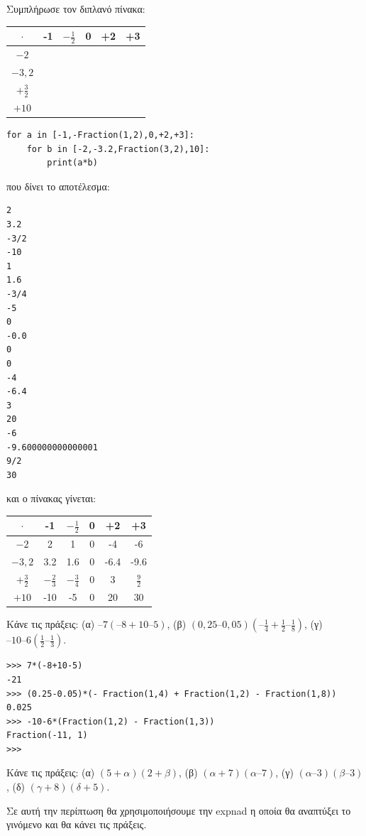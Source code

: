 \begin{exercise}
Συμπλήρωσε τον διπλανό πίνακα:
\begin{table}[h]
\begin{tabular}{|c|c|c|c|c|c|}
\hline
$\cdot$&-1&$-\frac{1}{2}$&0&+2&+3\\\hline
$-2$&&&&&\\\hline
$-3,2$&&&&&\\\hline
$+\frac{3}{2}$&&&&&\\\hline
$+10$&&&&&\\\hline
\end{tabular}
\end{table}
\end{exercise}
\begin{lstlisting}
for a in [-1,-Fraction(1,2),0,+2,+3]:
    for b in [-2,-3.2,Fraction(3,2),10]:
        print(a*b)
\end{lstlisting}
που δίνει το αποτέλεσμα:
\begin{lstlisting}
2
3.2
-3/2
-10
1
1.6
-3/4
-5
0
-0.0
0
0
-4
-6.4
3
20
-6
-9.600000000000001
9/2
30
\end{lstlisting}
και ο πίνακας γίνεται:
\begin{table}[h]
\begin{tabular}{|c|c|c|c|c|c|}
\hline
$\cdot$&-1&$-\frac{1}{2}$&0&+2&+3\\\hline
$-2$&2&1&0&-4&-6\\\hline
$-3,2$&3.2&1.6&0&-6.4&-9.6\\\hline
$+\frac{3}{2}$&$-\frac{2}{3}$&$-\frac{3}{4}$&0&3&$\frac{9}{2}$\\\hline
$+10$&-10&-5&0&20&30\\\hline
\end{tabular}
\end{table}
\begin{exercise}
Κάνε  τις πράξεις:  (α) $–7(–8+10–5)$,  (β) $(0,25–0,05)(– \frac{1}{4} + \frac{1}{2} – \frac{1}{8} )$,    (γ)$–10–6( \frac{1}{2} – \frac{1}{3})$.
\end{exercise}
\begin{lstlisting}
>>> 7*(-8+10-5)
-21
>>> (0.25-0.05)*(- Fraction(1,4) + Fraction(1,2) - Fraction(1,8))
0.025
>>> -10-6*(Fraction(1,2) - Fraction(1,3))
Fraction(-11, 1)
>>>
\end{lstlisting}
\begin{exercise}
Κάνε  τις πράξεις:  (α) $(5+α)(2+β)$,   (β) $(α+7)(α–7)$,   (γ) $(α–3)(β–3)$,   (δ) $(γ+8)(δ+5)$.
\end{exercise}
Σε αυτή την περίπτωση θα χρησιμοποιήσουμε την expnad η οποία θα αναπτύξει το γινόμενο και θα κάνει τις πράξεις.
